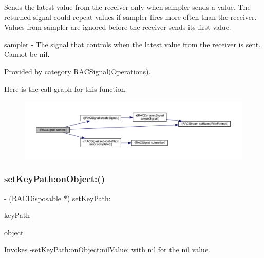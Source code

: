 Sends the latest value from the receiver only when {\ttfamily sampler} sends a value. The returned signal could repeat values if {\ttfamily sampler} fires more often than the receiver. Values from {\ttfamily sampler} are ignored before the receiver sends its first value.

sampler -\/ The signal that controls when the latest value from the receiver is sent. Cannot be nil. 

Provided by category \mbox{\hyperlink{category_r_a_c_signal_07_operations_08_a556702f113ba65f01fabf8363bd25e46}{R\+A\+C\+Signal(\+Operations)}}.

Here is the call graph for this function\+:\nopagebreak
\begin{figure}[H]
\begin{center}
\leavevmode
\includegraphics[width=350pt]{interface_r_a_c_signal_a556702f113ba65f01fabf8363bd25e46_cgraph}
\end{center}
\end{figure}
\mbox{\label{interface_r_a_c_signal_ada2a2f51a30fb8bef13819c50ebfbf85}} 
\subsubsection{\texorpdfstring{set\+Key\+Path\+:on\+Object\+:()}{setKeyPath:onObject:()}\hspace{0.1cm}{\footnotesize\ttfamily [1/3]}}
{\footnotesize\ttfamily -\/ (\mbox{\hyperlink{interface_r_a_c_disposable}{R\+A\+C\+Disposable}} $\ast$) set\+Key\+Path\+: \begin{DoxyParamCaption}\item[{(N\+S\+String $\ast$)}]{key\+Path }\item[{onObject:(N\+S\+Object $\ast$)}]{object }\end{DoxyParamCaption}}

Invokes -\/set\+Key\+Path\+:on\+Object\+:nil\+Value\+: with {\ttfamily nil} for the nil value.

